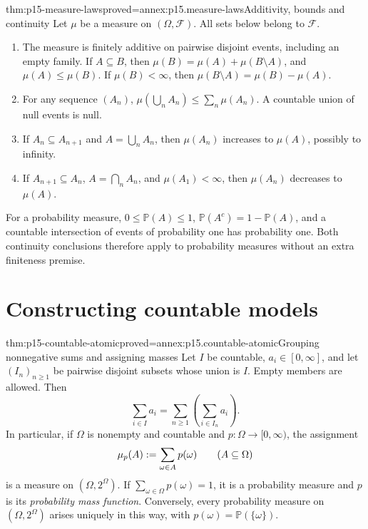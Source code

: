 \begin{hbtheorem}{thm:p15-measure-laws}{proved=annex:p15.measure-laws}{Additivity, bounds and continuity}
Let \(\mu\) be a measure on \((\Omega,\mathcal F)\). All sets below
belong to \(\mathcal F\).
\begin{enumerate}
\item The measure is finitely additive on pairwise disjoint events,
      including an empty family. If \(A\subseteq B\), then
      \(\mu(B)=\mu(A)+\mu(B\setminus A)\), and
      \(\mu(A)\leq\mu(B)\). If \(\mu(B)<\infty\), then
      \(\mu(B\setminus A)=\mu(B)-\mu(A)\).
\item For any sequence \((A_n)\),
      \(\mu(\bigcup_n A_n)\leq\sum_n\mu(A_n)\).
      A countable union of null events is null.
\item If \(A_n\subseteq A_{n+1}\) and \(A=\bigcup_n A_n\), then
      \(\mu(A_n)\) increases to \(\mu(A)\), possibly to infinity.
\item If \(A_{n+1}\subseteq A_n\), \(A=\bigcap_n A_n\), and
      \(\mu(A_1)<\infty\), then \(\mu(A_n)\) decreases to
      \(\mu(A)\).
\end{enumerate}
For a probability measure, \(0\leq\mathbb P(A)\leq1\),
\(\mathbb P(A^c)=1-\mathbb P(A)\), and a countable intersection of
events of probability one has probability one. Both continuity conclusions
therefore apply to probability measures without an extra finiteness premise.
\end{hbtheorem}

\section{Constructing countable models}
\label{sec:p15-countable-models}

\begin{hbtheorem}{thm:p15-countable-atomic}{proved=annex:p15.countable-atomic}{Grouping nonnegative sums and assigning masses}
Let \(I\) be countable, \(a_i\in[0,\infty]\), and let
\((I_n)_{n\geq1}\) be pairwise disjoint subsets whose union is \(I\).
Empty members are allowed. Then
\[
 \sum_{i\in I}a_i=\sum_{n\geq1}\left(\sum_{i\in I_n}a_i\right).
\]
In particular, if \(\Omega\) is nonempty and countable and
\(p:\Omega\to[0,\infty)\), the assignment
\[
 \mu_p(A)\mathrel{:=}\sum_{\omega\in A}p(\omega)
       \qquad(A\subseteq\Omega)
\]
is a measure on \((\Omega,2^\Omega)\). If
\(\sum_{\omega\in\Omega}p(\omega)=1\), it is a probability measure
and \(p\) is its \emph{probability mass function}. Conversely, every
probability measure on \((\Omega,2^\Omega)\) arises uniquely in this
way, with \(p(\omega)=\mathbb P(\{\omega\})\).
\end{hbtheorem}

